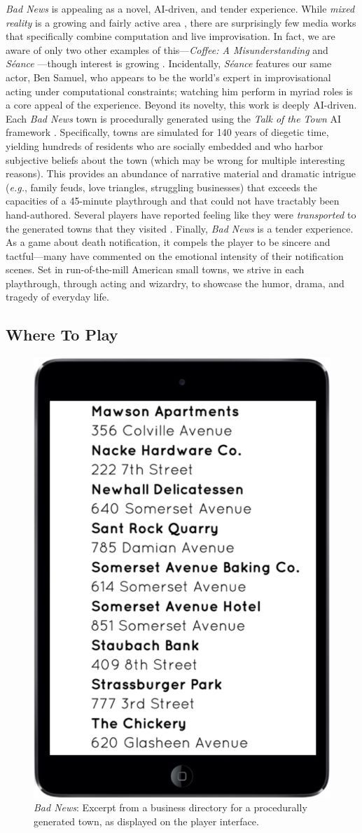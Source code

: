 \documentclass[letterpaper]{article}
\begin{document}
\textit{Bad News} is appealing as a novel, AI-driven, and tender experience. While \textit{mixed reality} is a growing and fairly active area \cite{ohta2014mixed}, there are surprisingly few media works that specifically combine computation and live improvisation. In fact, we are aware of only two other examples of this---\textit{Coffee: A Misunderstanding} \cite{squinkifer2014coffee} and \textit{S\'{e}ance} \cite{seance}---though interest is growing \cite{martens2016towards}. Incidentally, \textit{S\'{e}ance} features our same actor, Ben Samuel, who appears to be the world's expert in improvisational acting under computational constraints; watching him perform in myriad roles is a core appeal of the experience. Beyond its novelty, this work is deeply AI-driven. Each \textit{Bad News} town is procedurally generated using the \textit{Talk of the Town} AI framework \cite{ryan2015toward}. Specifically, towns are simulated for 140 years of diegetic time, yielding hundreds of residents who are socially embedded and who harbor subjective beliefs about the town (which may be wrong for multiple interesting reasons). This provides an abundance of narrative material and dramatic intrigue (\textit{e.g.}, family feuds, love triangles, struggling businesses) that exceeds the capacities of a 45-minute playthrough and that could not have tractably been hand-authored. Several players have reported feeling like they were \textit{transported} to the generated towns that they visited \cite{green2004understanding}. Finally, \textit{Bad News} is a tender experience. As a game about death notification, it compels the player to be sincere and tactful---many have commented on the emotional intensity of their notification scenes. Set in run-of-the-mill American small towns, we strive in each playthrough, through acting and wizardry, to showcase the humor, drama, and tragedy of everyday life.

\subsection{Where To Play}

\begin{figure}[t]
  \centering
  \includegraphics[width=0.42\columnwidth]{images/bad_news-player_interface}
  \caption{\textit{Bad News}: Excerpt from a business directory for a procedurally generated town, as displayed on the player interface.}
  \label{fig:bn-player_interface}
\end{figure}
\end{document}
